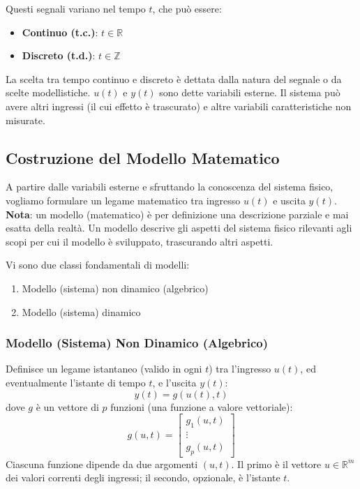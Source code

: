 \documentclass[11pt,a4paper]{article}
\begin{document}
Questi segnali variano nel tempo $t$, che può essere:
\begin{itemize}
    \item \textbf{Continuo (t.c.)}: $t \in \mathbb{R}$
    \item \textbf{Discreto (t.d.)}: $t \in \mathbb{Z}$
\end{itemize}
La scelta tra tempo continuo e discreto è dettata dalla natura del segnale o da scelte modellistiche. $u(t)$ e $y(t)$ sono dette variabili esterne. Il sistema può avere altri ingressi (il cui effetto è trascurato) e altre variabili caratteristiche non misurate.

\subsection{Costruzione del Modello Matematico}
A partire dalle variabili esterne e sfruttando la conoscenza del sistema fisico, vogliamo formulare un legame matematico tra ingresso $u(t)$ e uscita $y(t)$. 
\textbf{Nota}: un modello (matematico) è per definizione una descrizione parziale e mai esatta della realtà. Un modello descrive gli aspetti del sistema fisico rilevanti agli scopi per cui il modello è sviluppato, trascurando altri aspetti.

Vi sono due classi fondamentali di modelli:
\begin{enumerate}
    \item Modello (sistema) non dinamico (algebrico)
    \item Modello (sistema) dinamico
\end{enumerate}

\subsubsection{Modello (Sistema) Non Dinamico (Algebrico)}
Definisce un legame istantaneo (valido in ogni $t$) tra l'ingresso $u(t)$, ed eventualmente l'istante di tempo $t$, e l'uscita $y(t)$:
$$y(t)=g(u(t),t)$$
dove $g$ è un vettore di $p$ funzioni (una funzione a valore vettoriale):
$$g(u,t)=\begin{bmatrix}g_{1}(u,t)\\ \vdots\\ g_{p}(u,t)\end{bmatrix}$$
Ciascuna funzione dipende da due argomenti $(u, t)$. Il primo è il vettore $u \in \mathbb{R}^{m}$ dei valori correnti degli ingressi; il secondo, opzionale, è l'istante $t$.
\end{document}
